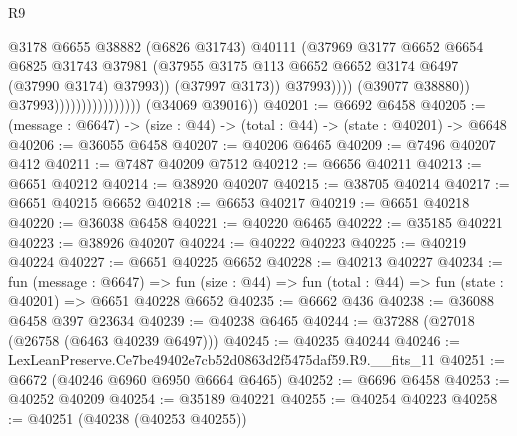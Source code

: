 \begin{lexlean}{R9}
\begin{coremodule}
                                                  @3178
                                                  @6655
                                                  @38882
                                                  (@6826 @31743)
                                                  @40111
                                                  (@37969
                                                    @3177
                                                    @6652
                                                    @6654
                                                    @6825
                                                    @31743
                                                    @37981
                                                    (@37955
                                                      @3175
                                                      @113
                                                      @6652
                                                      @6652
                                                      @3174
                                                      @6497
                                                      (@37990 @3174)
                                                      @37993))
                                                  (@37997 @3173))
                                                @37993))))
                                        (@39077 @38880))
                                      @37993))))))))))))))))
      (@34069 @39016))
@40201 := @6692 @6458
@40205 := (message : @6647) -> (size : @44) -> (total : @44) -> (state : @40201) -> @6648
@40206 := @36055 @6458
@40207 := @40206 @6465
@40209 := @7496 @40207 @412
@40211 := @7487 @40209 @7512
@40212 := @6656 @40211
@40213 := @6651 @40212
@40214 := @38920 @40207
@40215 := @38705 @40214
@40217 := @6651 @40215 @6652
@40218 := @6653 @40217
@40219 := @6651 @40218
@40220 := @36038 @6458
@40221 := @40220 @6465
@40222 := @35185 @40221
@40223 := @38926 @40207
@40224 := @40222 @40223
@40225 := @40219 @40224
@40227 := @6651 @40225 @6652
@40228 := @40213 @40227
@40234 := fun (message : @6647) =>
  fun (size : @44) => fun (total : @44) => fun (state : @40201) => @6651 @40228 @6652
@40235 := @6662 @436
@40238 := @36088 @6458 @397 @23634
@40239 := @40238 @6465
@40244 := @37288 (@27018 (@26758 (@6463 @40239 @6497)))
@40245 := @40235 @40244
@40246 := LexLeanPreserve.Ce7be49402e7cb52d0863d2f5475daf59.R9.__fits_11
@40251 := @6672 (@40246 @6960 @6950 @6664 @6465)
@40252 := @6696 @6458
@40253 := @40252 @40209
@40254 := @35189 @40221
@40255 := @40254 @40223
@40258 := @40251 (@40238 (@40253 @40255))

\end{coremodule}
\end{lexlean}
